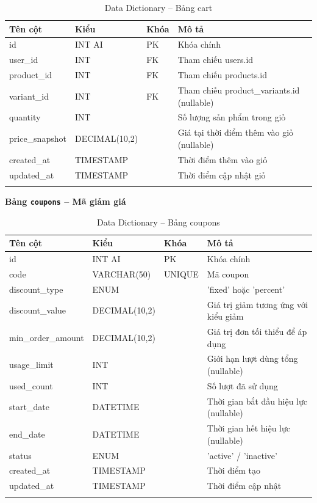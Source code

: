 \documentclass[a4paper]{article}
\begin{document}
\begin{longtable}{|p{3.5cm}|p{2.5cm}|p{1.5cm}|p{5cm}|}
\hline
\textbf{Tên cột} & \textbf{Kiểu} & \textbf{Khóa} & \textbf{Mô tả} \\
\hline
\endhead
id & INT AI & PK & Khóa chính \\
\hline
user\_id & INT & FK & Tham chiếu users.id \\
\hline
product\_id & INT & FK & Tham chiếu products.id \\
\hline
variant\_id & INT & FK & Tham chiếu product\_variants.id (nullable) \\
\hline
quantity & INT & & Số lượng sản phẩm trong giỏ \\
\hline
price\_snapshot & DECIMAL(10,2) & & Giá tại thời điểm thêm vào giỏ (nullable) \\
\hline
created\_at & TIMESTAMP & & Thời điểm thêm vào giỏ \\
\hline
updated\_at & TIMESTAMP & & Thời điểm cập nhật giỏ \\
\hline
\caption{Data Dictionary -- Bảng cart}
\end{longtable}

\textbf{Bảng \texttt{coupons} -- Mã giảm giá}

\begin{longtable}{|p{3.5cm}|p{2.5cm}|p{1.5cm}|p{5cm}|}
\hline
\textbf{Tên cột} & \textbf{Kiểu} & \textbf{Khóa} & \textbf{Mô tả} \\
\hline
\endhead
id & INT AI & PK & Khóa chính \\
\hline
code & VARCHAR(50) & UNIQUE & Mã coupon \\
\hline
discount\_type & ENUM & & 'fixed' hoặc 'percent' \\
\hline
discount\_value & DECIMAL(10,2) & & Giá trị giảm tương ứng với kiểu giảm \\
\hline
min\_order\_amount & DECIMAL(10,2) & & Giá trị đơn tối thiểu để áp dụng \\
\hline
usage\_limit & INT & & Giới hạn lượt dùng tổng (nullable) \\
\hline
used\_count & INT & & Số lượt đã sử dụng \\
\hline
start\_date & DATETIME & & Thời gian bắt đầu hiệu lực (nullable) \\
\hline
end\_date & DATETIME & & Thời gian hết hiệu lực (nullable) \\
\hline
status & ENUM & & 'active' / 'inactive' \\
\hline
created\_at & TIMESTAMP & & Thời điểm tạo \\
\hline
updated\_at & TIMESTAMP & & Thời điểm cập nhật \\
\hline
\caption{Data Dictionary -- Bảng coupons}
\end{longtable}
\end{document}
